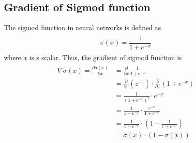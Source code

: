 \documentclass[paper=a4, fontsize=11pt]{scrartcl} %
\numberwithin{equation}{section} %
\numberwithin{figure}{section} %
\numberwithin{table}{section} %
\begin{document}
\subsection{Gradient of Sigmod function}
The sigmod function in neural networks is defined as
\begin{align} 
\begin{split}
	\sigma(x)= \dfrac{1}{1+e^{-x}}
\end{split}					
\end{align}
where $x$ is s scalar. Thus, the gradient of sigmod function is
\begin{align} 
\begin{split}
 \nabla \sigma(x) = \frac{\partial \sigma(x)}{\partial x} &= \frac{\partial}{\partial x} \frac{1}{1+e^{-x}}\\
     &= \frac{\partial}{\partial z} (z^{-1}) \cdot  \frac{\partial}{\partial x}(1+e^{-x}) \\
     &= \frac{1}{(1+e^{-x})^2} \cdot e^{-x} \\
     &= \frac{1}{1+e^{-x}} \cdot \frac{e^{-x}}{1+e^{-x}} \\
     &= \frac{1}{1+e^{-x}} \cdot \left(1 - \frac{1}{1+e^{-x}} \right) \\
     &= \sigma(x) \cdot \left(1- \sigma(x) \right)
\end{split}					
\end{align}
 
\end{document}

